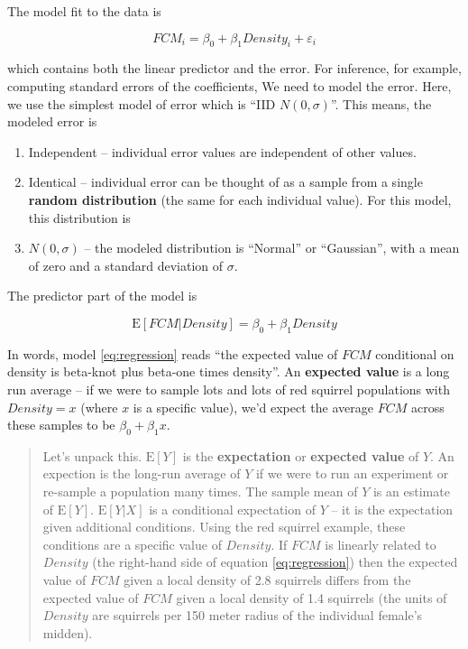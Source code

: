 \documentclass[]{book}
\providecommand{\tightlist}{%
  \setlength{\itemsep}{0pt}\setlength{\parskip}{0pt}}
\begin{document}
The model fit to the data is

\begin{equation}
FCM_i = \beta_0 + \beta_1 Density_i + \varepsilon_i
\label{eq:fcm-model}
\end{equation}

which contains both the linear predictor and the error. For inference,
for example, computing standard errors of the coefficients, We need to
model the error. Here, we use the simplest model of error which is ``IID
\(N(0, \sigma)\)''. This means, the modeled error is

\begin{enumerate}
\def\labelenumi{\arabic{enumi}.}
\tightlist
\item
  Independent -- individual error values are independent of other
  values.
\item
  Identical -- individual error can be thought of as a sample from a
  single \textbf{random distribution} (the same for each individual
  value). For this model, this distribution is
\item
  \(N(0, \sigma)\) -- the modeled distribution is ``Normal'' or
  ``Gaussian'', with a mean of zero and a standard deviation of
  \(\sigma\).
\end{enumerate}

The predictor part of the model is

\begin{equation}
\textrm{E}[FCM|Density] = \beta_0 + \beta_1 Density
\label{eq:regression}
\end{equation}

In words, model \eqref{eq:regression} reads ``the expected value of
\(FCM\) conditional on density is beta-knot plus beta-one times
density''. An \textbf{expected value} is a long run average -- if we
were to sample lots and lots of red squirrel populations with
\(Density=x\) (where \(x\) is a specific value), we'd expect the average
\(FCM\) across these samples to be \(\beta_0 + \beta_1 x\).

\begin{quote}
Let's unpack this. \(\textrm{E}[Y]\) is the \textbf{expectation} or
\textbf{expected value} of \(Y\). An expection is the long-run average
of \(Y\) if we were to run an experiment or re-sample a population many
times. The sample mean of \(Y\) is an estimate of \(\textrm{E}[Y]\).
\(\textrm{E}[Y|X]\) is a conditional expectation of \(Y\) -- it is the
expectation given additional conditions. Using the red squirrel example,
these conditions are a specific value of \(Density\). If \(FCM\) is
linearly related to \(Density\) (the right-hand side of equation
\eqref{eq:regression}) then the expected value of \(FCM\) given a local
density of 2.8 squirrels differs from the expected value of \(FCM\)
given a local density of 1.4 squirrels (the units of \(Density\) are
squirrels per 150 meter radius of the individual female's midden).
\end{quote}
\end{document}
